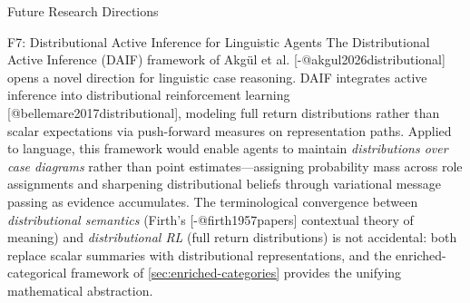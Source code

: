\documentclass[
  ignorenonframetext,
]{beamer}
\begin{document}
\begin{frame}{Future Research Directions}
\begin{block}{F7: Distributional Active Inference for Linguistic Agents}
\protect{}\label{f7-distributional-active-inference-for-linguistic-agents}
The Distributional Active Inference (DAIF) framework of Akgül et al.
{[}-@akgul2026distributional{]} opens a novel direction for linguistic
case reasoning. DAIF integrates active inference into distributional
reinforcement learning {[}@bellemare2017distributional{]}, modeling full
return distributions rather than scalar expectations via push-forward
measures on representation paths. Applied to language, this framework
would enable agents to maintain \emph{distributions over case diagrams}
rather than point estimates---assigning probability mass across role
assignments and sharpening distributional beliefs through variational
message passing as evidence accumulates. The terminological convergence
between \emph{distributional semantics} (Firth's {[}-@firth1957papers{]}
contextual theory of meaning) and \emph{distributional RL} (full return
distributions) is not accidental: both replace scalar summaries with
distributional representations, and the enriched-categorical framework
of \autoref{sec:enriched-categories} provides the unifying mathematical
abstraction.
\end{block}
\end{frame}
\end{document}
